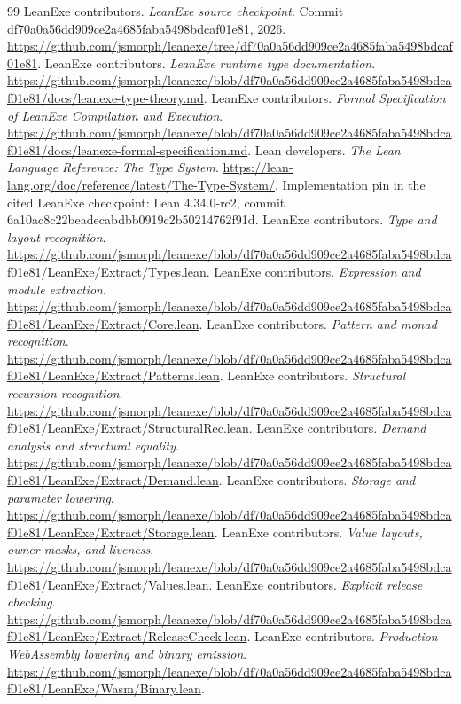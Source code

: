 \documentclass[11pt]{article}
\begin{document}
\begin{thebibliography}{99}
\small
{} LeanExe contributors. \emph{LeanExe source checkpoint}. Commit df70a0a56dd909ce2a4685faba5498bdcaf01e81, 2026. \url{https://github.com/jsmorph/leanexe/tree/df70a0a56dd909ce2a4685faba5498bdcaf01e81}.
 LeanExe contributors. \emph{LeanExe runtime type documentation}. \url{https://github.com/jsmorph/leanexe/blob/df70a0a56dd909ce2a4685faba5498bdcaf01e81/docs/leanexe-type-theory.md}.
 LeanExe contributors. \emph{Formal Specification of LeanExe Compilation and Execution}. \url{https://github.com/jsmorph/leanexe/blob/df70a0a56dd909ce2a4685faba5498bdcaf01e81/docs/leanexe-formal-specification.md}.
 Lean developers. \emph{The Lean Language Reference: The Type System}. \url{https://lean-lang.org/doc/reference/latest/The-Type-System/}. Implementation pin in the cited LeanExe checkpoint: Lean 4.34.0-rc2, commit 6a10ac8c22beadecabdbb0919c2b50214762f91d.
 LeanExe contributors. \emph{Type and layout recognition}. \url{https://github.com/jsmorph/leanexe/blob/df70a0a56dd909ce2a4685faba5498bdcaf01e81/LeanExe/Extract/Types.lean}.
 LeanExe contributors. \emph{Expression and module extraction}. \url{https://github.com/jsmorph/leanexe/blob/df70a0a56dd909ce2a4685faba5498bdcaf01e81/LeanExe/Extract/Core.lean}.
 LeanExe contributors. \emph{Pattern and monad recognition}. \url{https://github.com/jsmorph/leanexe/blob/df70a0a56dd909ce2a4685faba5498bdcaf01e81/LeanExe/Extract/Patterns.lean}.
 LeanExe contributors. \emph{Structural recursion recognition}. \url{https://github.com/jsmorph/leanexe/blob/df70a0a56dd909ce2a4685faba5498bdcaf01e81/LeanExe/Extract/StructuralRec.lean}.
 LeanExe contributors. \emph{Demand analysis and structural equality}. \url{https://github.com/jsmorph/leanexe/blob/df70a0a56dd909ce2a4685faba5498bdcaf01e81/LeanExe/Extract/Demand.lean}.
 LeanExe contributors. \emph{Storage and parameter lowering}. \url{https://github.com/jsmorph/leanexe/blob/df70a0a56dd909ce2a4685faba5498bdcaf01e81/LeanExe/Extract/Storage.lean}.
 LeanExe contributors. \emph{Value layouts, owner masks, and liveness}. \url{https://github.com/jsmorph/leanexe/blob/df70a0a56dd909ce2a4685faba5498bdcaf01e81/LeanExe/Extract/Values.lean}.
 LeanExe contributors. \emph{Explicit release checking}. \url{https://github.com/jsmorph/leanexe/blob/df70a0a56dd909ce2a4685faba5498bdcaf01e81/LeanExe/Extract/ReleaseCheck.lean}.
 LeanExe contributors. \emph{Production WebAssembly lowering and binary emission}. \url{https://github.com/jsmorph/leanexe/blob/df70a0a56dd909ce2a4685faba5498bdcaf01e81/LeanExe/Wasm/Binary.lean}.

\end{thebibliography}
\end{document}

